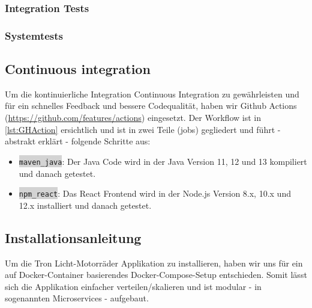 \documentclass[11pt,ngerman]{article}
\newcommand{\inlinecode}[2]{\colorbox{lightgray}{\lstinline[language=#1]$#2$}}
\begin{document}
    \subsubsection{Integration Tests}

    \subsubsection{Systemtests}

    \subsection{Continuous integration}
    Um  die kontinuierliche Integration \Gls{Continuous Integration} zu gewährleisten und für ein schnelles Feedback und bessere Codequalität, haben wir Github Actions (\url{https://github.com/features/actions}) eingesetzt. Der Workflow ist in \autoref{lst:GHAction} ersichtlich  und ist in zwei Teile (jobs) gegliedert und führt - abstrakt erklärt - folgende Schritte aus:

    \begin{itemize}
        \item \inlinecode{bash}{maven_java}: Der Java Code wird in der Java Version 11, 12 und 13 kompiliert und danach getestet.
        \item \inlinecode{bash}{npm_react}: Das React Frontend wird in der Node.js Version 8.x, 10.x und 12.x installiert und danach getestet.
    \end{itemize}

    
    \vspace{.5cm}

    \subsection{Installationsanleitung}
    Um  die Tron Licht-Motorräder Applikation zu installieren, haben  wir uns für ein auf \Gls{Docker}-Container basierendes \Gls{Docker-Compose}-Setup entschieden. Somit lässt sich die Applikation einfacher verteilen/skalieren und ist modular - in sogenannten \Glspl{Microservice} - aufgebaut.
\end{document}
